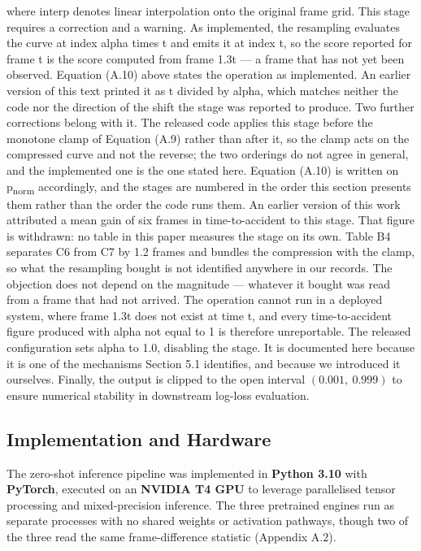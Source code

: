 where \(\text{interp}\) denotes linear interpolation onto the original frame grid. This stage requires a correction and a warning. As implemented, the resampling evaluates the curve at index alpha times t and emits it at index t, so the score reported for frame t is the score computed from frame 1.3t --- a frame that has not yet been observed. Equation (A.10) above states the operation as implemented. An earlier version of this text printed it as t divided by alpha, which matches neither the code nor the direction of the shift the stage was reported to produce. Two further corrections belong with it. The released code applies this stage before the monotone clamp of Equation (A.9) rather than after it, so the clamp acts on the compressed curve and not the reverse; the two orderings do not agree in general, and the implemented one is the one stated here. Equation (A.10) is written on p\textsubscript{norm} accordingly, and the stages are numbered in the order this section presents them rather than the order the code runs them. An earlier version of this work attributed a mean gain of six frames in time-to-accident to this stage. That figure is withdrawn: no table in this paper measures the stage on its own. Table B4 separates C6 from C7 by 1.2 frames and bundles the compression with the clamp, so what the resampling bought is not identified anywhere in our records. The objection does not depend on the magnitude --- whatever it bought was read from a frame that had not arrived. The operation cannot run in a deployed system, where frame 1.3t does not exist at time t, and every time-to-accident figure produced with alpha not equal to 1 is therefore unreportable. The released configuration sets alpha to 1.0, disabling the stage. It is documented here because it is one of the mechanisms Section 5.1 identifies, and because we introduced it ourselves. Finally, the output is clipped to the open interval \((0.001,\ 0.999)\) to ensure numerical stability in downstream log-loss evaluation.


\subsection{Implementation and Hardware}

The zero-shot inference pipeline was implemented in \textbf{Python 3.10} with \textbf{PyTorch}, executed on an \textbf{NVIDIA T4 GPU} to leverage parallelised tensor processing and mixed-precision inference. The three pretrained engines run as separate processes with no shared weights or activation pathways, though two of the three read the same frame-difference statistic (Appendix A.2).


